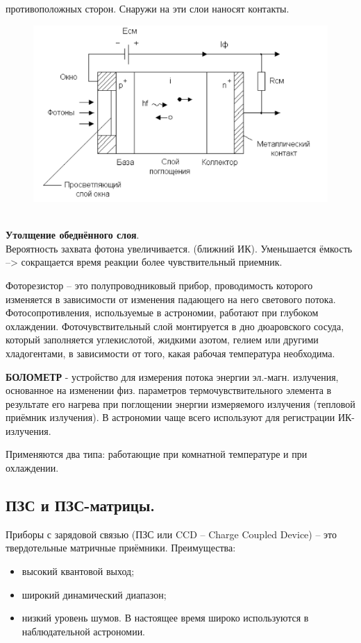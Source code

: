 \documentclass[12pt]{article}
\begin{document}
противоположных сторон.
Снаружи на эти слои наносят
контакты.
\begin{figure}[h]
	\centering
	\includegraphics[width=0.7\linewidth]{"Снимок экрана от 2024-12-23 19-34-25"}
\end{figure}\\
\textbf{Утолщение обеднённого слоя}.\\
Вероятность захвата фотона
увеличивается. (ближний ИК).
Уменьшается ёмкость –>
сокращается время реакции
более чувствительный приемник.

Фоторезистор – это полупроводниковый прибор,
проводимость которого изменяется в зависимости от
изменения падающего на него светового потока.
Фотосопротивления, используемые в астрономии,
работают при глубоком охлаждении.
Фоточувствительный слой монтируется в дно
дюаровского сосуда, который заполняется
углекислотой, жидкими азотом, гелием или другими
хладогентами, в зависимости от того, какая рабочая
температура необходима.

\textbf{БОЛОМЕТР} - устройство для измерения
потока энергии эл.-магн. излучения,
основанное на изменении физ.
параметров термочувствительного
элемента в результате его нагрева при
поглощении энергии измеряемого
излучения (тепловой приёмник
излучения).
В астрономии чаще всего используют для
регистрации ИК-излучения.

Применяются два типа: работающие при
комнатной температуре и при
охлаждении.

\subsection{ПЗС и ПЗС-матрицы.}
Приборы с зарядовой связью (ПЗС или CCD – Charge Coupled Device) –
это твердотельные матричные приёмники.
Преимущества:
\begin{itemize}
\item высокий квантовой выход;
\item широкий динамический диапазон;
\item низкий уровень шумов.
	В настоящее время широко используются в наблюдательной астрономии.
\end{itemize}
\end{document}

